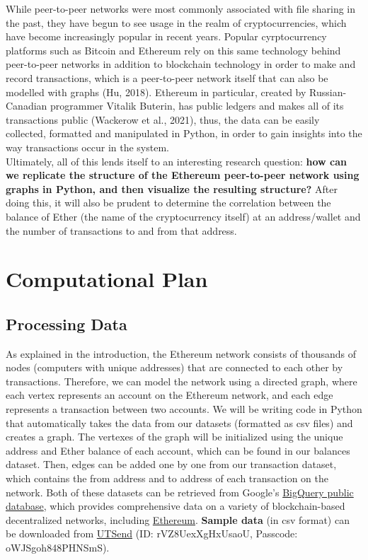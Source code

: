 \documentclass[fontsize=11pt]{article}
\begin{document}
    While peer-to-peer networks were most commonly associated with file sharing in the past, they have begun to see usage in the realm of cryptocurrencies, which have become increasingly popular in recent years. Popular cyrptocurrency platforms such as Bitcoin and Ethereum rely on this same technology behind peer-to-peer networks in addition to blockchain technology in order to make and record transactions, which is a peer-to-peer network itself that can also be modelled with graphs (Hu, 2018). Ethereum in particular, created by Russian-Canadian programmer Vitalik Buterin, has public ledgers and makes all of its transactions public (Wackerow et al., 2021), thus, the data can be easily collected, formatted and manipulated in Python, in order to gain insights into the way transactions occur in the system. \\
    
    Ultimately, all of this lends itself to an interesting research question: \textbf{how can we replicate the structure of the Ethereum peer-to-peer network using graphs in Python, and then visualize the resulting structure?} After doing this, it will also be prudent to determine the correlation between the balance of Ether (the name of the cryptocurrency itself) at an address/wallet and the number of transactions to and from that address.

\section*{Computational Plan}

\subsection*{Processing Data}

As explained in the introduction, the Ethereum network consists of thousands of nodes (computers with unique addresses) that are connected to each other by transactions. Therefore, we can model the network using a directed graph, where each vertex represents an account on the Ethereum network, and each edge represents a transaction between two accounts. We will be writing code in Python that automatically takes the data from our datasets (formatted as csv files) and creates a graph. The vertexes of the graph will be initialized using the unique address and Ether balance of each account, which can be found in our balances dataset. Then, edges can be added one by one from our transaction dataset, which contains the from address and to address of each transaction on the network. Both of these datasets can be retrieved from Google's \href{https://console.cloud.google.com/marketplace/browse?filter=solution-type:dataset}{BigQuery public database}, which provides comprehensive data on a variety of blockchain-based decentralized networks, including \href{https://console.cloud.google.com/marketplace/product/ethereum/crypto-ethereum-blockchain}{Ethereum}. \textbf{Sample data} (in csv format) can be downloaded from \href{https://send.utoronto.ca/pickup.php}{UTSend} (ID: rVZ8UexXgHxUsaoU, Passcode: oWJSgoh848PHNSmS). \\
\end{document}

